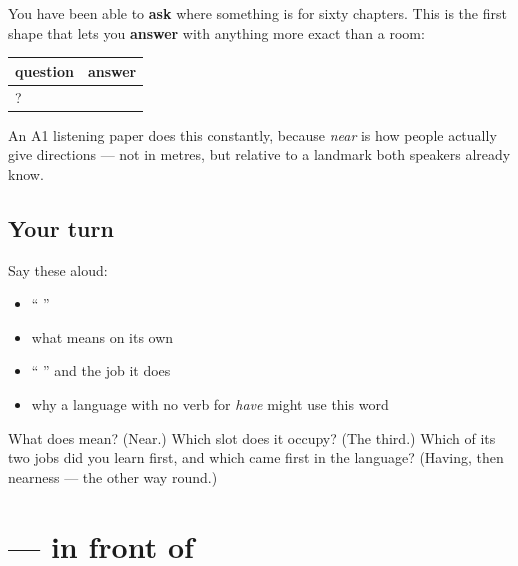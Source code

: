 \begin{grammarlens}[title={Grammar Lens: a place answer}]
You have been able to \textbf{ask} where something is for sixty chapters. This is the first shape that lets you \textbf{answer} with anything more exact than a room:

\noindent
\begin{tabularx}{\linewidth}{@{}>{\raggedright\arraybackslash}X>{\raggedright\arraybackslash}X@{}}
\toprule
\textbf{question} & \textbf{answer} \\
\midrule
\hi{दुकान} \hi{कहाँ} \hi{है}? & \hi{घर} \hi{के} \hi{पास।} \\
\bottomrule
\end{tabularx}

An A1 listening paper does this constantly, because \emph{near} is how people actually give directions — not in metres, but relative to a landmark both speakers already know.
\end{grammarlens}

\subsection*{Your turn}
Say these aloud:

\begin{itemize}
\raggedright
  \item \textquotedblleft{}    \textquotedblright{}
  \item what \textbf{} means on its own
  \item \textquotedblleft{} \textquotedblright{} and the job it does
  \item why a language with no verb for \emph{have} might use this word
\end{itemize}

\begin{tcolorbox}[breakable,colback=teal!4,colframe=teal!35!black,title={Before you move on}]
What does \textbf{} mean? (Near.) Which slot does it occupy? (The third.) Which of its two jobs did you learn first, and which came first in the language? (Having, then nearness — the other way round.)
\end{tcolorbox}
\section[\texorpdfstring{\hi{के} \hi{सामने} (ke sāmne)}{के सामने (ke sāmne)}]{  — in front of}

